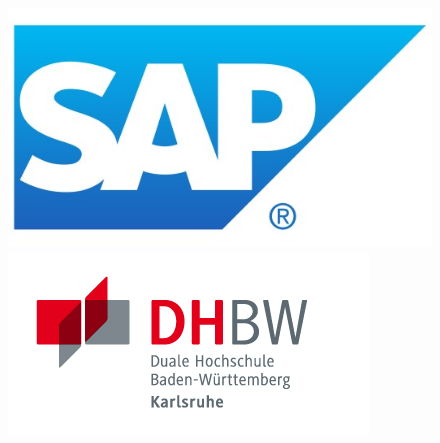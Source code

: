 \thispagestyle{plain}
\begin{titlepage}
\begin{spacing}{1.0}
\enlargethispage{4.0cm}
\sffamily 								%
				
\begin{figure}
\begin{minipage}[htbp]{5cm}
	\centering
	\includegraphics[scale=0.25]{Bilder/522x294.jpg}

\end{minipage}
\hfill
\begin{minipage}[htbp]{5cm}
	\centering 
	\includegraphics[scale=2.0]{Bilder/logo_dhbw.jpg}

\end{minipage} 
\end{figure}

% 				


\end{spacing}
\end{titlepage}
